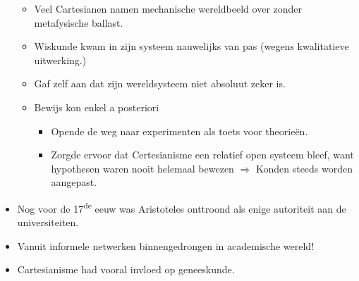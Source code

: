 \documentclass{article}
\begin{document}
\begin{itemize}
\begin{itemize}
        \item Veel Cartesianen namen mechanische wereldbeeld over zonder metafysische ballast.
        \item Wiskunde kwam in zijn systeem nauwelijks van pas (wegens kwalitatieve uitwerking.)
        \item Gaf zelf aan dat zijn wereldsysteem niet absoluut zeker is.
        \item Bewijs kon enkel a posteriori
        \begin{itemize}
          \item Opende de weg naar experimenten als toets voor theorie\"en.
          \item Zorgde ervoor dat Certesianisme een relatief open systeem bleef, want hypothesen waren nooit helemaal bewezen $\Rightarrow$ Konden steeds worden aangepast.
        \end{itemize}
      \end{itemize}
      \item Nog voor de 17\textsuperscript{de} eeuw was Aristoteles onttroond als enige autoriteit aan de universiteiten.
      \item Vanuit informele netwerken binnengedrongen in academische wereld!
      \item Cartesianisme had vooral invloed op geneeskunde.
    \end{itemize}

  \newpage
\end{document}
